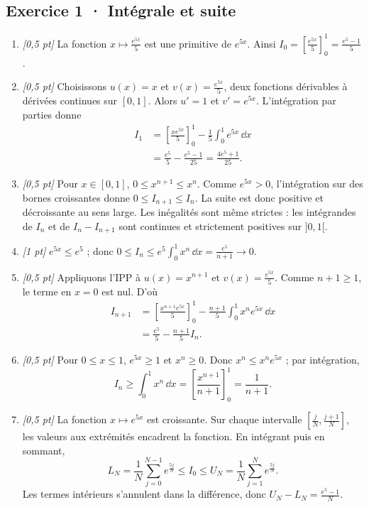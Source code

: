 \subsection*{Exercice 1 · Intégrale et suite}\begin{enumerate}

\item \textit{[0{,}5 pt]} La fonction $x\mapsto \frac{e^{5x}}{5}$ est une primitive de $e^{5x}$. Ainsi $I_0=[\frac{e^{5x}}{5}]_0^1=\frac{e^{5}-1}{5}$.

\item \textit{[0{,}5 pt]} Choisissons $u(x)=x$ et $v(x)=\frac{e^{5x}}{5}$, deux fonctions dérivables à dérivées continues sur $[0,1]$. Alors $u'=1$ et $v'=e^{5x}$. L'intégration par parties donne
\[\begin{aligned}I_1&=\left[\frac{xe^{5x}}{5}\right]_0^1-\frac{1}{5}\int_0^1e^{5x}\,\dd x\\&=\frac{e^{5}}{5}-\frac{e^{5}-1}{25}=\frac{4e^{5}+1}{25}.\end{aligned}\]

\item \textit{[0{,}5 pt]} Pour $x\in[0,1]$, $0\le x^{n+1}\le x^n$. Comme $e^{5x}>0$, l'intégration sur des bornes croissantes donne $0\le I_{n+1}\le I_n$. La suite est donc positive et décroissante au sens large. Les inégalités sont même strictes : les intégrandes de $I_n$ et de $I_n-I_{n+1}$ sont continues et strictement positives sur $]0,1[$.

\item \textit{[1 pt]} $e^{5x}\le e^{5}$ ; donc $0\le I_n\le e^{5}\int_0^1x^n\,\dd x=\frac{e^{5}}{n+1}\to0$.

\item \textit{[0{,}5 pt]} Appliquons l'IPP à $u(x)=x^{n+1}$ et $v(x)=\frac{e^{5x}}{5}$. Comme $n+1\ge1$, le terme en $x=0$ est nul. D'où
\[\begin{aligned}I_{n+1}&=\left[\frac{x^{n+1}e^{5x}}{5}\right]_0^1-\frac{n+1}{5}\int_0^1x^ne^{5x}\,\dd x\\&=\frac{e^{5}}{5}-\frac{n+1}{5}I_n.\end{aligned}\]

\item \textit{[0{,}5 pt]} Pour $0\le x\le1$, $e^{5x}\ge1$ et $x^n\ge0$. Donc $x^n\le x^ne^{5x}$ ; par intégration,
\[I_n\ge\int_0^1x^n\,\dd x=\left[\frac{x^{n+1}}{n+1}\right]_0^1=\frac{1}{n+1}.\]

\item \textit{[0{,}5 pt]} La fonction $x\mapsto e^{5x}$ est croissante. Sur chaque intervalle $[\frac{j}{N},\frac{j+1}{N}]$, les valeurs aux extrémités encadrent la fonction. En intégrant puis en sommant,
\[L_N=\frac{1}{N}\sum_{j=0}^{N-1}e^{\frac{5j}{N}}\le I_0\le U_N=\frac{1}{N}\sum_{j=1}^Ne^{\frac{5j}{N}}.\]
Les termes intérieurs s'annulent dans la différence, donc $U_N-L_N=\frac{e^{5}-1}{N}$.


\end{enumerate}
